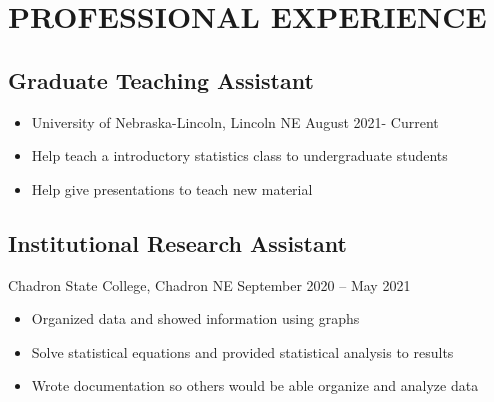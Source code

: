 				  \section{PROFESSIONAL EXPERIENCE}
				  	  \subsection{Graduate Teaching Assistant}
				   \begin{itemize}
 \item University of Nebraska-Lincoln, Lincoln NE August 2021- Current
 \item	Help teach a introductory statistics class to undergraduate students
 \item	Help give presentations to teach new material
 \end{itemize}

		  	  \subsection{ Institutional Research Assistant}
Chadron State College, Chadron NE September 2020 – May 2021
        \begin{itemize}
            \item Organized data and showed information using graphs
            \item Solve statistical equations and provided statistical   analysis to results
            \item Wrote documentation so others would be able organize and analyze data
        \end{itemize}





